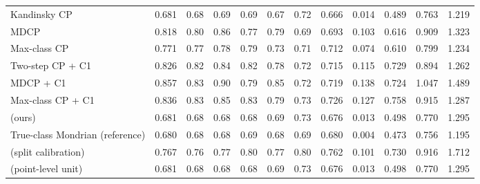 \begin{table}[!htbp]
{\begin{tabular}{lccccccccccc}
Kandinsky CP & 0.681 & 0.68 & 0.69 & 0.69 & 0.67 & 0.72 & 0.666 & 0.014 & 0.489 & 0.763 & 1.219 \\
MDCP & 0.818 & 0.80 & 0.86 & 0.77 & 0.79 & 0.69 & 0.693 & 0.103 & 0.616 & 0.909 & 1.323 \\
Max-class CP & 0.771 & 0.77 & 0.78 & 0.79 & 0.73 & 0.71 & 0.712 & 0.074 & 0.610 & 0.799 & 1.234 \\
Two-step CP + C1 & 0.826 & 0.82 & 0.84 & 0.82 & 0.78 & 0.72 & 0.715 & 0.115 & 0.729 & 0.894 & 1.262 \\
MDCP + C1 & 0.857 & 0.83 & 0.90 & 0.79 & 0.85 & 0.72 & 0.719 & 0.138 & 0.724 & 1.047 & 1.489 \\
Max-class CP + C1 & 0.836 & 0.83 & 0.85 & 0.83 & 0.79 & 0.73 & 0.726 & 0.127 & 0.758 & 0.915 & 1.287 \\
\gamut{} (ours) & 0.681 & 0.68 & 0.68 & 0.68 & 0.69 & 0.73 & 0.676 & 0.013 & 0.498 & 0.770 & 1.295 \\
True-class Mondrian (reference) & 0.680 & 0.68 & 0.68 & 0.69 & 0.68 & 0.69 & 0.680 & 0.004 & 0.473 & 0.756 & 1.195 \\
\gamut{} (split calibration) & 0.767 & 0.76 & 0.77 & 0.80 & 0.77 & 0.80 & 0.762 & 0.101 & 0.730 & 0.916 & 1.712 \\
\gamut{} (point-level unit) & 0.681 & 0.68 & 0.68 & 0.68 & 0.69 & 0.73 & 0.676 & 0.013 & 0.498 & 0.770 & 1.295 \\
\bottomrule
\end{tabular}}
\end{table}
\FloatBarrier

